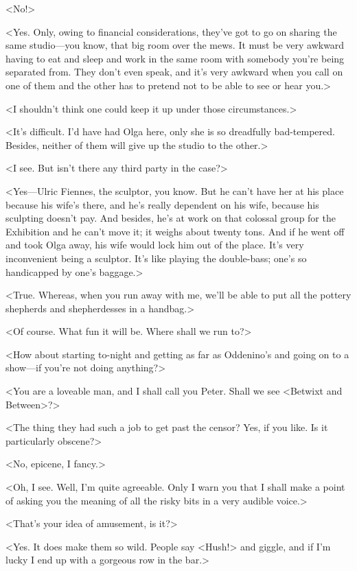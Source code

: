 <No!>

<Yes. Only, owing to financial considerations, they've got to go on sharing the same studio—you know, that big room over the mews. It must be very awkward having to eat and sleep and work in the same room with somebody you're being separated from. They don't even speak, and it's very awkward when you call on one of them and the other has to pretend not to be able to see or hear you.>

<I shouldn't think one could keep it up under those circumstances.>

<It's difficult. I'd have had Olga here, only she is so dreadfully bad-tempered. Besides, neither of them will give up the studio to the other.>

<I see. But isn't there any third party in the case?>

<Yes—Ulric Fiennes, the sculptor, you know. But he can't have her at his place because his wife's there, and he's really dependent on his wife, because his sculpting doesn't pay. And besides, he's at work on that colossal group for the Exhibition and he can't move it; it weighs about twenty tons. And if he went off and took Olga away, his wife would lock him out of the place. It's very inconvenient being a sculptor. It's like playing the double-bass; one's so handicapped by one's baggage.>

<True. Whereas, when you run away with me, we'll be able to put all the pottery shepherds and shepherdesses in a handbag.>

<Of course. What fun it will be. Where shall we run to?>

<How about starting to-night and getting as far as Oddenino's and going on to a show—if you're not doing anything?>

<You are a loveable man, and I shall call you Peter. Shall we see <Betwixt and Between>?>

<The thing they had such a job to get past the censor? Yes, if you like. Is it particularly obscene?>

<No, epicene, I fancy.>

<Oh, I see. Well, I'm quite agreeable. Only I warn you that I shall make a point of asking you the meaning of all the risky bits in a very audible voice.>

<That's your idea of amusement, is it?>

<Yes. It does make them so wild. People say <Hush!> and giggle, and if I'm lucky I end up with a gorgeous row in the bar.>

